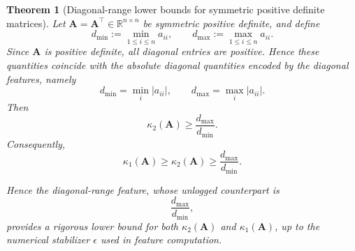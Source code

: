 \documentclass[11pt,a4paper]{article}
\theoremstyle{plain}
\newtheorem{theorem}{Theorem}[section]
\theoremstyle{definition}
\theoremstyle{remark}
\begin{document}
\begin{theorem}[Diagonal-range lower bounds for symmetric positive definite matrices]
\label{thm:diag_range_lower}
Let $\mathbf{A}=\mathbf{A}^\top\in\mathbb{R}^{n\times n}$ be symmetric positive definite, and define
\begin{equation*}
d_{\min}:=\min_{1\le i\le n} a_{ii},
\qquad
d_{\max}:=\max_{1\le i\le n} a_{ii}.
\end{equation*}
Since $\mathbf A$ is positive definite, all diagonal entries are positive. Hence these quantities coincide with the absolute diagonal quantities encoded by the diagonal features, namely
\[
d_{\min}=\min_i |a_{ii}|,
\qquad
d_{\max}=\max_i |a_{ii}|.
\]
Then
\begin{equation}
\label{eq:diag_range_kappa2_lower}
\kappa_2(\mathbf{A})\ge \frac{d_{\max}}{d_{\min}}.
\end{equation}
Consequently,
\begin{equation}
\label{eq:diag_range_kappa1_lower}
\kappa_1(\mathbf{A})\ge \kappa_2(\mathbf{A})\ge \frac{d_{\max}}{d_{\min}}.
\end{equation}

Hence the diagonal-range feature, whose unlogged counterpart is
\begin{equation*}
\frac{d_{\max}}{d_{\min}},
\end{equation*}
provides a rigorous lower bound for both $\kappa_2(\mathbf{A})$ and $\kappa_1(\mathbf{A})$, up to the numerical stabilizer $\epsilon$ used in feature computation.
\end{theorem}
\end{document}
